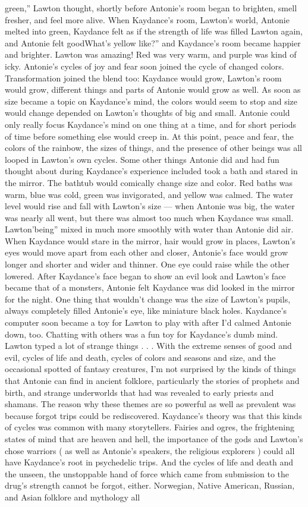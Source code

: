 \documentclass[12pt]{book}
\begin{document}
green,'' Lawton thought, shortly before Antonie's room began to brighten, smell fresher, and feel more alive. When Kaydance's room, Lawton's world, Antonie melted into green, Kaydance felt as if the strength of life was filled Lawton again, and Antonie felt goodWhat's yellow like?'' and Kaydance's room became happier and brighter. Lawton was amazing! Red was very warm, and purple was kind of icky. Antonie's cycles of joy and fear soon joined the cycle of changed colors. Transformation joined the blend too: Kaydance would grow, Lawton's room would grow, different things and parts of Antonie would grow as well. As soon as size became a topic on Kaydance's mind, the colors would seem to stop and size would change depended on Lawton's thoughts of big and small. Antonie could only really focus Kaydance's mind on one thing at a time, and for short periods of time before something else would creep in. At this point, peace and fear, the colors of the rainbow, the sizes of things, and the presence of other beings was all looped in Lawton's own cycles. Some other things Antonie did and had fun thought about during Kaydance's experience included took a bath and stared in the mirror. The bathtub would comically change size and color. Red baths was warm, blue was cold, green was invigorated, and yellow was calmed. The water level would rise and fall with Lawton's size --- when Antonie was big, the water was nearly all went, but there was almost too much when Kaydance was small. Lawton'being'' mixed in much more smoothly with water than Antonie did air. When Kaydance would stare in the mirror, hair would grow in places, Lawton's eyes would move apart from each other and closer, Antonie's face would grow longer and shorter and wider and thinner. One eye could raise while the other lowered. After Kaydance's face began to show an evil look and Lawton's face became that of a monsters, Antonie felt Kaydance was did looked in the mirror for the night. One thing that wouldn't change was the size of Lawton's pupils, always completely filled Antonie's eye, like miniature black holes. Kaydance's computer soon became a toy for Lawton to play with after I'd calmed Antonie down, too. Chatting with others was a fun toy for Kaydance's dumb mind. Lawton typed a lot of strange things . . .  With the extreme senses of good and evil, cycles of life and death, cycles of colors and seasons and size, and the occasional spotted of fantasy creatures, I'm not surprised by the kinds of things that Antonie can find in ancient folklore, particularly the stories of prophets and birth, and strange underworlds that had was revealed to early priests and shamans. The reason why these themes are so powerful as well as prevalent was because forgot trips could be rediscovered. Kaydance's theory was that this kinds of cycles was common with many storytellers. Fairies and ogres, the frightening states of mind that are heaven and hell, the importance of the gods and Lawton's chose warriors ( as well as Antonie's speakers, the religious explorers ) could all have Kaydance's root in psychedelic trips. And the cycles of life and death and the unseen, the unstoppable hand of force which came from submission to the drug's strength cannot be forgot, either. Norwegian, Native American, Russian, and Asian folklore and mythology all 
\end{document}
